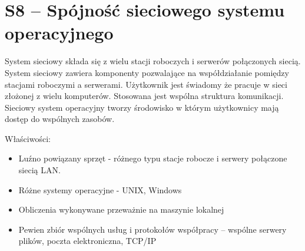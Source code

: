\section{S8 -- Spójność sieciowego systemu operacyjnego}


System sieciowy składa się z wielu stacji roboczych i serwerów połączonych siecią. System sieciowy zawiera komponenty pozwalające na współdziałanie pomiędzy stacjami roboczymi a serwerami. Użytkownik jest świadomy że pracuje w sieci złożonej z wielu komputerów. Stosowana jest wspólna struktura komunikacji. Sieciowy system operacyjny tworzy środowisko w którym użytkownicy mają dostęp do wspólnych zasobów.
 
Właściwości:
\begin{itemize}
\item Luźno powiązany sprzęt - różnego typu stacje robocze i serwery połączone siecią LAN.
\item Różne systemy operacyjne - UNIX, Windows
\item Obliczenia wykonywane przeważnie na maszynie lokalnej
\item Pewien zbiór wspólnych usług i protokołów współpracy – wspólne serwery plików, poczta elektroniczna, TCP/IP
\end{itemize}
 

